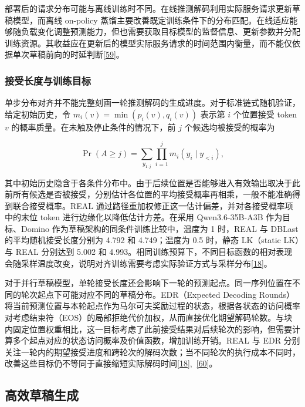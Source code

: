 \documentclass[11pt,a4paper,UTF8,fontset=none,scheme=plain,zihao=-4]{ctexart}
\begin{document}
部署后的请求分布可能与离线训练时不同。在线推测解码利用实际服务请求更新草稿模型，而离线
on-policy
蒸馏主要改善既定训练条件下的分布匹配。在线适应能够随负载变化调整预测能力，但也需要获取目标模型的监督信息、更新参数并分配训练资源。其收益应在更新后的模型实际服务请求的时间范围内衡量，而不能仅依据单次草稿前向的时延判断\protect\hyperlink{ref-onlinespec}{{[}59{]}}。

\hypertarget{section-3-1-2}{%
\subsubsection{接受长度与训练目标}\label{section-3-1-2}}

单步分布对齐并不能完整刻画一轮推测解码的生成进度。对于标准链式随机验证，给定初始历史，令
\(m_i(v)=\min(p_i(v),q_i(v))\) 表示第 \(i\) 个位置接受 token \(v\)
的概率质量。在未触及停止条件的情况下，前 \(j\) 个候选均被接受的概率为

\[
\Pr(A\ge j)=
\sum_{y_{1:j}}\prod_{i=1}^j m_i(y_i\mid y_{<i}),
\]

其中初始历史隐含于各条件分布中。由于后续位置是否能够进入有效输出取决于此前所有候选是否被接受，分别估计各位置的平均接受概率再相乘，一般不能准确得到联合接受概率。REAL
通过路径重加权修正这一估计偏差，并对各接受概率项中的末位 token
进行边缘化以降低估计方差。在采用 Qwen3.6-35B-A3B 作为目标、Domino
作为草稿架构的同条件训练比较中，温度为 1 时，REAL 与 DBLast
的平均随机接受长度分别为 4.792 和 4.749；温度为 0.5 时，静态 LK（static
LK）与 REAL 分别达到 5.002 和
4.993。相同训练预算下，不同目标函数的相对表现会随采样温度改变，说明对齐训练需要考虑实际验证方式与采样分布\protect\hyperlink{ref-realloss}{{[}18{]}}。

对于并行草稿模型，单轮接受长度还会影响下一轮的预测起点。同一序列位置在不同的轮次起点下可能对应不同的草稿分布。EDR（Expected
Decoding
Rounds）将当前预测位置与本轮起点作为马尔可夫奖励过程的状态，根据各状态的访问概率对考虑结束符（EOS）的局部拒绝代价加权，从而直接优化期望解码轮数。与块内固定位置权重相比，这一目标考虑了此前接受结果对后续轮次的影响，但需要计算多个起点对应的状态访问概率及价值函数，增加训练开销。REAL
与 EDR
分别关注一轮内的期望接受进度和跨轮次的解码次数；当不同轮次的执行成本不同时，改善这些目标仍不等同于直接缩短实际解码时间\protect\hyperlink{ref-realloss}{{[}18{]}},~\protect\hyperlink{ref-edr}{{[}60{]}}。

\hypertarget{section-3-2}{%
\subsection{高效草稿生成}\label{section-3-2}}
\end{document}
